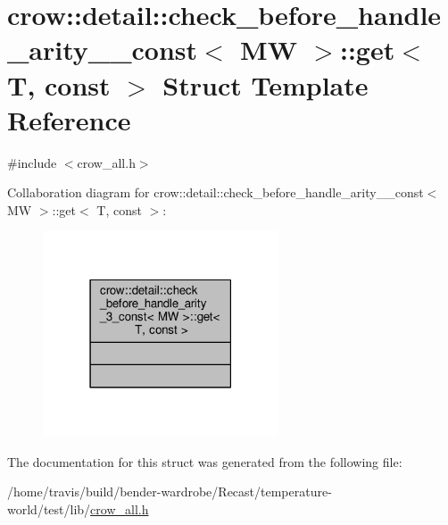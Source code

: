 \hypertarget{structcrow_1_1detail_1_1check__before__handle__arity__3__const_1_1get}{\section{crow\-:\-:detail\-:\-:check\-\_\-before\-\_\-handle\-\_\-arity\-\_\-\_\-const$<$ M\-W $>$\-:\-:get$<$ T, const $>$ Struct Template Reference}
\label{structcrow_1_1detail_1_1check__before__handle__arity__3__const_1_1get}
}


{\ttfamily \#include $<$crow\-\_\-all.\-h$>$}



Collaboration diagram for crow\-:\-:detail\-:\-:check\-\_\-before\-\_\-handle\-\_\-arity\-\_\-\_\-const$<$ M\-W $>$\-:\-:get$<$ T, const $>$\-:
\nopagebreak
\begin{figure}[H]
\begin{center}
\leavevmode
\includegraphics[width=198pt]{structcrow_1_1detail_1_1check__before__handle__arity__3__const_1_1get__coll__graph}
\end{center}
\end{figure}


The documentation for this struct was generated from the following file\-:\begin{DoxyCompactItemize}
\item 
/home/travis/build/bender-\/wardrobe/\-Recast/temperature-\/world/test/lib/\hyperlink{crow__all_8h}{crow\-\_\-all.\-h}\end{DoxyCompactItemize}
